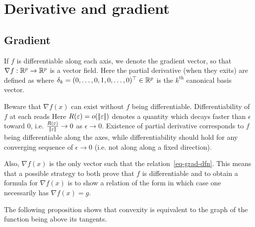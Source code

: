 \section{Derivative and gradient}

\subsection{Gradient}


If $f$ is differentiable along each axis, we denote 
the gradient vector, so that $\nabla f : \mathbb{R}^p \rightarrow \mathbb{R}^p$ is a vector field. Here the partial derivative (when they exits) are defined as
where $\delta_k=(0,\ldots,0,1,0,\ldots,0)^\top \in \mathbb{R}^p$ is the $k^{\text{th}}$ canonical basis vector.  

Beware that $\nabla f(x)$ can exist without $f$ being differentiable. Differentiability of $f$ at each reads
%
Here $R(\varepsilon) = o(|\!| \varepsilon |\!|)$ denotes a quantity which decays faster than $\epsilon$ toward $0$, i.e. $\frac{R(\varepsilon)}{|\!| \varepsilon |\!|} \rightarrow 0$ as $\epsilon \rightarrow 0$. Existence of partial derivative corresponds to $f$ being differentiable along the axes, while differentiability should hold for any converging sequence of $\epsilon\rightarrow 0$ (i.e. not along along a fixed direction). 

Also, $\nabla f(x)$ is the only vector such that the relation~\eqref{eq-grad-dfn}. This means that a possible strategy to both prove that $f$ is differentiable and to obtain a formula for $\nabla f(x)$ is to show a relation of the form 
in which case one necessarily has $\nabla f(x)=g$. 

The following proposition shows that convexity is equivalent to the graph of the function being above its tangents.

